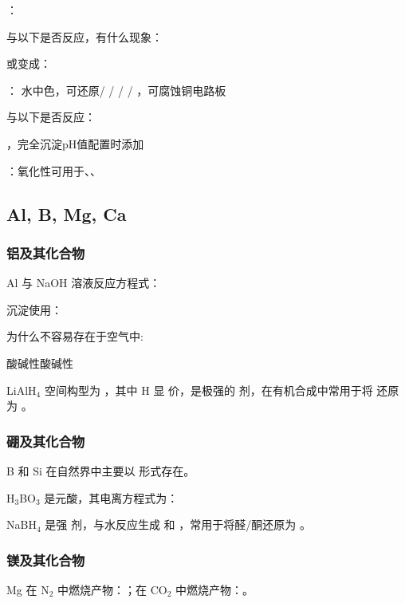 ：

与以下是否反应，有什么现象：


或变成：

：
水中\sbl 色，可还原\sbl / \sbl / \sbl / \sbl / \sbl ，\sbl 可腐蚀铜电路板

与以下是否反应：

，完全沉淀pH值\csb 配置时添加\sbl


：氧化性\sbl 可用于\mbl、\mbl、\mbl

\subsection{Al, B, Mg, Ca}

\subsubsection{铝及其化合物}
Al 与 NaOH 溶液反应方程式：\lbl

沉淀使用：

为什么\ce{[Al(OH)4]^{-}}不容易存在于空气中:


酸碱性\csb \quad \ce{[Al(OH)4]^{-}}酸碱性\csb 

LiAlH$_4$ 空间构型为 \sbl ，其中 H 显 \sbl 价，是极强的 \sbl 剂，在有机合成中常用于将 \sbl 还原为 \sbl 。

\subsubsection{硼及其化合物}
B 和 Si 在自然界中主要以 \sbl 形式存在。

H$_3$BO$_3$ 是\sbl 元\sbl 酸，其电离方程式为：\lbl

NaBH$_4$ 是强 \sbl 剂，与水反应生成 \sbl 和 \sbl ，常用于将醛/酮还原为 \sbl 。

\subsubsection{镁及其化合物}
Mg 在 N$_2$ 中燃烧产物：\sbl ；在 CO$_2$ 中燃烧产物：\sbl 。

